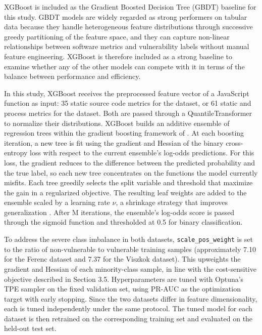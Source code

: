 XGBoost is included as the Gradient Boosted Decision Tree (GBDT) baseline for this study. GBDT models are widely regarded as strong performers on tabular data because they handle heterogeneous feature distributions through successive greedy partitioning of the feature space, and they can capture non-linear relationships between software metrics and vulnerability labels without manual feature engineering. XGBoost is therefore included as a strong baseline to examine whether any of the other models can compete with it in terms of the balance between performance and efficiency.

In this study, XGBoost receives the preprocessed feature vector of a JavaScript function as input: 35 static source code metrics for the \citet{ferenc_challenging_2019} dataset, or 61 static and process metrics for the \citet{viszkok_improving_2021} dataset. Both are passed through a QuantileTransformer to normalize their distributions. XGBoost builds an additive ensemble of regression trees \citep{chen_xgboost_2016} within the gradient boosting framework of \citet{friedman_httpwwwjstororg_2001}. At each boosting iteration, a new tree is fit using the gradient and Hessian of the binary cross-entropy loss with respect to the current ensemble’s log-odds predictions. For this loss, the gradient reduces to the difference between the predicted probability and the true label, so each new tree concentrates on the functions the model currently misfits. Each tree greedily selects the split variable and threshold that maximize the gain in a regularized objective. The resulting leaf weights are added to the ensemble scaled by a learning rate $\nu$, a shrinkage strategy that improves generalization \citep{friedman_httpwwwjstororg_2001}. After M iterations, the ensemble’s log-odds score is passed through the sigmoid function and thresholded at 0.5 for binary classification.

To address the severe class imbalance in both datasets, \texttt{scale\_pos\_weight} is set to the ratio of non-vulnerable to vulnerable training samples (approximately 7.10 for the Ferenc dataset and 7.37 for the Viszkok dataset). This upweights the gradient and Hessian of each minority-class sample, in line with the cost-sensitive objective described in Section 3.5. Hyperparameters are tuned with Optuna’s TPE sampler on the fixed validation set, using PR-AUC as the optimization target with early stopping. Since the two datasets differ in feature dimensionality, each is tuned independently under the same protocol. The tuned model for each dataset is then retrained on the corresponding training set and evaluated on the held-out test set.

